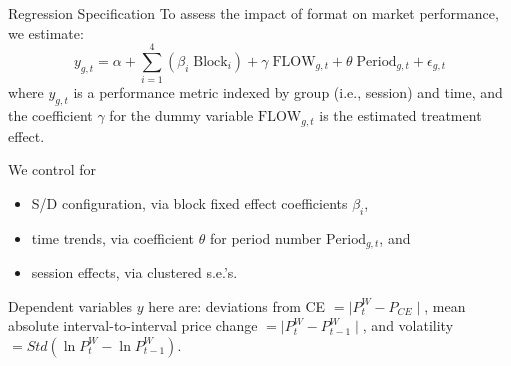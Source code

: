 \documentclass[10pt]{beamer}
\begin{document}
\begin{frame}{Regression Specification}
To assess the impact of format on market performance, we estimate: 
\begin{equation} \label{eq:reg}
    y_{g,t} = \alpha + \sum^{4}_{i = 1} \left(\beta_i \; \text{Block}_i\right) + \gamma \; \text{FLOW}_{g,t} + \theta \; \text{Period}_{g,t} + \epsilon_{g,t}
\end{equation}
where $y_{g,t}$ is a performance metric 
indexed by group (i.e., session) and time, 
and the coefficient $\gamma$ 
for the dummy variable $\text{FLOW}_{g,t}$ is the estimated treatment effect. %

We control for 
\begin{itemize}
\item S/D configuration, via  block fixed effect coefficients $\beta_i$,  
\item time trends, via coefficient $\theta$ for period number $\text{Period}_{g,t}$, and
\item session effects, via clustered s.e.'s.
\end{itemize} %
 
Dependent variables $y$ here are: deviations from CE $ =\mid P^W_t - P_{CE}\mid$, 
mean absolute interval-to-interval price change $=\mid P^W_{t} - P^W_{t - 1}\mid$, and 
volatility $=Std\left(\ln P^W_{t} - \ln P^W_{t - 1}\right).$
\end{frame}
\end{document}
